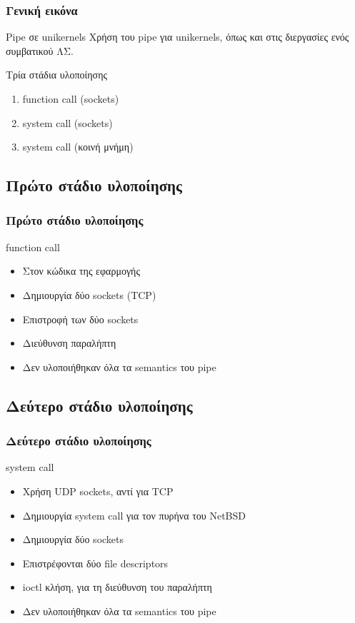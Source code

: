 \documentclass[red,slidestop,notes,compress,mathserif]{beamer}
\begin{document}
\begin{frame}
\frametitle{Γενική εικόνα}
\begin{block}{Pipe σε unikernels}
Χρήση του pipe για unikernels, όπως και στις διεργασίες ενός συμβατικού ΛΣ.
\end{block}
\begin{block}{Τρία στάδια υλοποίησης}
\begin{enumerate}
\item function call (sockets)
\item system call (sockets)
\item system call (κοινή μνήμη)
\end{enumerate}
\end{block}
\end{frame}

\subsection{Πρώτο στάδιο υλοποίησης}

\begin{frame}
\frametitle{Πρώτο στάδιο υλοποίησης}
\begin{block}{function call}
\begin{itemize}
\item Στον κώδικα της εφαρμογής
\item Δημιουργία δύο sockets (TCP)
\item Επιστροφή των δύο sockets
\item Διεύθυνση παραλήπτη
\item Δεν υλοποιήθηκαν όλα τα semantics του pipe 
\end{itemize}
\end{block}
\end{frame}

\subsection{Δεύτερο στάδιο υλοποίησης}

\begin{frame}
\frametitle{Δεύτερο στάδιο υλοποίησης}
\begin{block}{system call}
\begin{itemize}
\item Χρήση UDP sockets, αντί για TCP
\item Δημιουργία system call για τον πυρήνα του NetBSD
\item Δημιουργία δύο sockets
\item Επιστρέφονται δύο file descriptors
\item ioctl κλήση, για τη διεύθυνση του παραλήπτη
\item Δεν υλοποιήθηκαν όλα τα semantics του pipe 
\end{itemize}
\end{block}
\end{frame}
\end{document}
